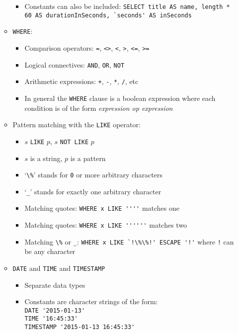 \documentclass[landscape,8pt]{extarticle}
\newcommand{\code}{\lstinline}
\begin{document}
\begin{multicols}{4}
\begin{itemize}
\begin{itemize}
\begin{itemize}
        \item Constants can also be included: \code{SELECT title AS name, length * 60 AS durationInSeconds, `seconds' AS inSeconds}
    \end{itemize}
        \item \code{WHERE}:
        \begin{itemize}
            \item Comparison operators: \code{=}, \code{<>}, \code{<}, \code{>}, \code{<=}, \code{>=}
            \item Logical connectives: \code{AND}, \code{OR}, \code{NOT}
            \item Arithmetic expressions: \code{+}, \code{-}, \code{*}, \code{/}, etc
            \item In general the \code{WHERE} clause is a boolean expression where each condition is
            of the form \emph{expression op expression}
        \end{itemize}
        \item Pattern matching with the \code{LIKE} operator:
        \begin{itemize}
            \item $s$ \code{LIKE} $p$, $s$ \code{NOT LIKE} $p$
            \item $s$ is a string, $p$ is a pattern
            \item `\code{\%}' stands for \code{0} or more arbitrary characters
            \item `\code{_}' stands for exactly one arbitrary character
            \item Matching quotes: \code{WHERE x LIKE ''''} matches one 
            \item Matching quotes: \code{WHERE x LIKE ''''''} matches two 
            \item Matching \code{\%} or \code{_}: \code{WHERE x LIKE `!\%\%!' ESCAPE '!'} where
            \code{!} can be any character
        \end{itemize}
        \item \code{DATE} and \code{TIME} and \code{TIMESTAMP}
        \begin{itemize}
            \item Separate data types
            \item Constants are character strings of the form: \\
\code{DATE '2015-01-13'} \\
\code{TIME '16:45:33'} \\
\code{TIMESTAMP '2015-01-13 16:45:33'} \\

\end{itemize}
\end{itemize}
\end{itemize}
\end{multicols}
\end{document}
